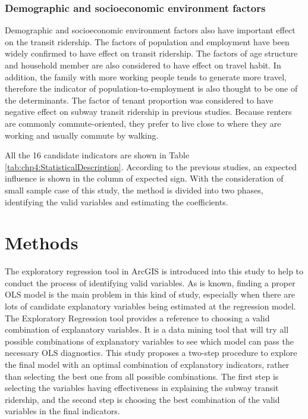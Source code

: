 %
\subsubsection{Demographic and socioeconomic environment factors}
%
Demographic and socioeconomic environment factors also have important effect on the transit ridership. The factors of population and employment have been widely confirmed to have effect on transit ridership. The factors of age structure and household member are also considered to have effect on travel habit. In addition, the family with more working people tends to generate more travel, therefore the indicator of population-to-employment is also thought to be one of the determinants. The factor of tenant proportion was considered to have negative effect on subway transit ridership in previous studies. Because renters are commonly commute-oriented, they prefer to live close to where they are working and usually commute by walking.

%
All the 16 candidate indicators are shown in Table \ref{tab:chp4:StatisticalDescription}. According to the previous studies, an expected influence is shown in the column of expected sign. With the consideration of small sample case of this study, the method is divided into two phases, identifying the valid variables and estimating the coefficients.

%
\section{Methods}
%
The exploratory regression tool in ArcGIS is introduced into this study to help to conduct the process of identifying valid variables. As is known, finding a proper OLS model is the main problem in this kind of study, especially when there are lots of candidate explanatory variables being estimated at the regression model. The Exploratory Regression tool provides a reference to choosing a valid combination of explanatory variables. It is a data mining tool that will try all possible combinations of explanatory variables to see which model can pass the necessary OLS diagnostics. This study proposes a two-step procedure to explore the final model with an optimal combination of explanatory indicators, rather than selecting the best one from all possible combinations. The first step is selecting the variables having effectiveness in explaining the subway transit ridership, and the second step is choosing the best combination of the valid variables in the final indicators.


